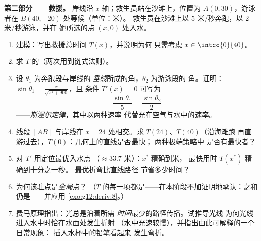 \begin{problem}
\medskip
\noindent\textbf{第二部分——救援。}
岸线沿 $x$ 轴；救生员站在沙滩上，位置为
$A(0, 30)$，游泳者在 $B(40, -20)$ 处等候（单位：米）。
救生员在沙滩上以 $5$ 米/秒奔跑，以 $2$ 米/秒游泳，并在
她所选的点 $(x, 0)$ 处入水。
\begin{enumerate}[resume]
  \item 建模：写出救援总时间 $T(x)$，并说明为何
        只需考虑 $x \in \intcc{0}{40}$。
  \item 求 $T$ 的（两次用到链式法则）。
  \item 设 $\theta_1$ 为奔跑段与岸线的
        \emph{垂线}所成的角，$\theta_2$ 为游泳段的
        角。证明：
        $\sin\theta_1 = \frac{x}{\sqrt{x^2 + 900}}$，且
        条件 $T'(x) = 0$ 可写为
        \[
        \frac{\sin\theta_1}{5} = \frac{\sin\theta_2}{2}
        \]
——\emph{斯涅尔定律}，其中以两种速率
        代替光在空气与水中的速率。
  \item 线段 $[AB]$ 与岸线在
        $x = 24$ 处相交。求 $T(24)$、$T(40)$（沿海滩跑
        再直游过去），$T(0)$：几何上的直线是否最快；
        两种极端策略中
        是否有最快者？
  \item 对 $T'$ 用定位最优入水点
        （$\approx 33.7$ 米）：$x^*$ 精确到米，
        最快用时 $T(x^*)$ 精确到十分之一秒。
        最优折弯比直线路径
        节省多少时间？
  \item 为何该驻点是\emph{全局}点？
        （$T$ 的每一项都是——在本阶段不加证明地承认：之和
        仍是——并应用
        \cref{exo:g12:deriv:8}。）
  \item 费马原理指出：光总是沿着所需
        \emph{时间}最少的路径传播。试推导光线
        为何光线进入水中时恰在水面处发生折射
        （水中光速较慢），并指出由此可解释的一个日常现象：
        插入水杯中的铅笔看起来
        发生弯折。
\end{enumerate}


\end{problem}

